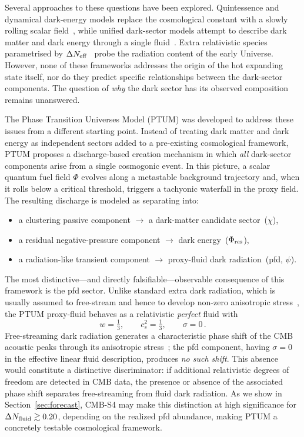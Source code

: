 \documentclass[epj]{svjour}
\begin{document}
Several approaches to these questions have been explored. Quintessence
and dynamical dark-energy models replace the cosmological constant
with a slowly rolling scalar field~\cite{RatraPeebles,Caldwell1998},
while unified dark-sector models attempt to describe dark matter and
dark energy through a single fluid~\cite{Kamenshchik2001,Bento2002}.
Extra relativistic species parametrised by
$\Delta N_{\rm eff}$~\cite{Mangano2005,Cyburt2016} probe the
radiation content of the early Universe. However, none of these
frameworks addresses the origin of the hot expanding state itself, nor
do they predict specific relationships between the dark-sector
components. The question of \emph{why} the dark sector has its
observed composition remains unanswered.

The Phase Transition Universes Model (PTUM) was developed to address
these issues from a different starting point. Instead of treating dark
matter and dark energy as independent sectors added to a pre-existing
cosmological framework, PTUM proposes a discharge-based creation
mechanism in which \emph{all} dark-sector components arise from a
single cosmogonic event. In this picture, a scalar quantum fuel field
$\Phi$ evolves along a metastable background trajectory and, when it
rolls below a critical threshold, triggers a tachyonic waterfall in
the proxy field. The resulting discharge is modeled as
separating into:

\begin{itemize}
\item a clustering passive component $\rightarrow$ a dark-matter candidate sector~($\chi$),
\item a residual negative-pressure component $\rightarrow$
      dark energy~($\Phi_{\rm res}$),
\item a radiation-like transient component $\rightarrow$
      proxy-fluid dark radiation~(pfd, $\psi$).
\end{itemize}

The most distinctive---and directly falsifiable---observable
consequence of this framework is the pfd sector. Unlike standard
extra dark radiation, which is usually assumed to free-stream and
hence to develop non-zero anisotropic
stress~\cite{Bashinsky2004,Baumann2016,Follin2015}, the PTUM
proxy-fluid behaves as a relativistic \emph{perfect} fluid with
\begin{equation}
w = \tfrac{1}{3},\qquad
c_s^{2} = \tfrac{1}{3},\qquad
\sigma = 0\,.
\label{eq:pfd_signature}
\end{equation}
Free-streaming dark radiation generates a characteristic phase shift
of the CMB acoustic peaks through its anisotropic
stress~\cite{Bashinsky2004,Baumann2016,Follin2015}; the pfd
component, having $\sigma=0$ in the effective linear fluid description,
produces \emph{no such shift}. This absence would constitute a
distinctive discriminator: if additional relativistic degrees of freedom
are detected in CMB data, the presence or absence of the associated
phase shift separates free-streaming from fluid dark radiation. As we
show in Section~\ref{sec:forecast}, CMB-S4 may make this distinction
at high significance for $\Delta N_{\rm fluid}\gtrsim 0.20$,
depending on the realized pfd abundance, making PTUM a concretely
testable cosmological framework.
\end{document}
